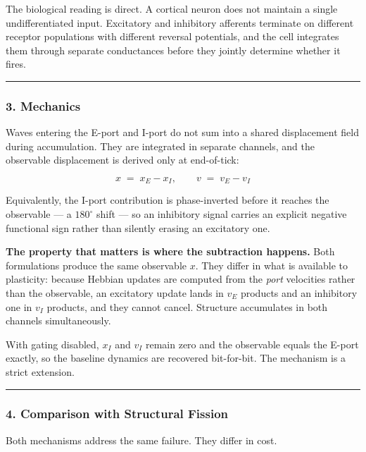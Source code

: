 \documentclass[
  11pt,
  a4paper,
]{article}
\begin{document}
The biological reading is direct. A cortical neuron does not maintain a
single undifferentiated input. Excitatory and inhibitory afferents
terminate on different receptor populations with different reversal
potentials, and the cell integrates them through separate conductances
before they jointly determine whether it fires.

\begin{center}\rule{0.5\linewidth}{0.5pt}\end{center}

\subsubsection{3. Mechanics}\label{mechanics}

Waves entering the E-port and I-port do not sum into a shared
displacement field during accumulation. They are integrated in separate
channels, and the observable displacement is derived only at
end-of-tick:

\[
x \;=\; x_E - x_I, \qquad v \;=\; v_E - v_I
\]

Equivalently, the I-port contribution is phase-inverted before it
reaches the observable --- a \(180^\circ\) shift --- so an inhibitory
signal carries an explicit negative functional sign rather than silently
erasing an excitatory one.

\textbf{The property that matters is where the subtraction happens.}
Both formulations produce the same observable \(x\). They differ in what
is available to plasticity: because Hebbian updates are computed from
the \emph{port} velocities rather than the observable, an excitatory
update lands in \(v_E\) products and an inhibitory one in \(v_I\)
products, and they cannot cancel. Structure accumulates in both channels
simultaneously.

With gating disabled, \(x_I\) and \(v_I\) remain zero and the observable
equals the E-port exactly, so the baseline dynamics are recovered
bit-for-bit. The mechanism is a strict extension.

\begin{center}\rule{0.5\linewidth}{0.5pt}\end{center}

\subsubsection{4. Comparison with Structural
Fission}\label{comparison-with-structural-fission}

Both mechanisms address the same failure. They differ in cost.
\end{document}
